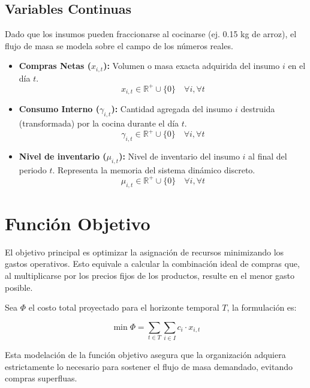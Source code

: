 \documentclass[12pt]{report}
\begin{document}
\subsection{Variables Continuas}
Dado que los insumos pueden fraccionarse al cocinarse (ej. 0.15 kg de arroz), el flujo de masa se modela sobre el campo de los números reales.
\begin{itemize}
    \item \textbf{Compras Netas ($x_{i,t}$):} Volumen o masa exacta adquirida del insumo $i$ en el día $t$.
    \begin{equation}
        x_{i,t} \in \mathbb{R}^{+} \cup \{0\} \quad \forall i, \forall t
    \end{equation}

    \item \textbf{Consumo Interno ($\gamma_{i,t}$):} Cantidad agregada del insumo $i$ destruida (transformada) por la cocina durante el día $t$.
    \begin{equation}
        \gamma_{i,t} \in \mathbb{R}^{+} \cup \{0\} \quad \forall i, \forall t
    \end{equation}

    \item \textbf{Nivel de inventario ($\mu_{i,t}$):} Nivel de inventario del insumo $i$ al final del periodo $t$. Representa la memoria del sistema dinámico discreto.
    \begin{equation}
        \mu_{i,t} \in \mathbb{R}^{+} \cup \{0\} \quad \forall i, \forall t
    \end{equation}
\end{itemize}

\section{Función Objetivo}

El objetivo principal es optimizar la asignación de recursos minimizando los gastos operativos. Esto equivale a calcular la combinación ideal de compras que, al multiplicarse por los precios fijos de los productos, resulte en el menor gasto posible. 

Sea $\Phi$ el costo total proyectado para el horizonte temporal $T$, la formulación es:

\begin{equation}
    \min \Phi = \sum_{t \in T} \sum_{i \in I} c_i \cdot x_{i,t}
\end{equation}

Esta modelación de la función objetivo asegura que la organización adquiera estrictamente lo necesario para sostener el flujo de masa demandado, evitando compras superfluas.
\end{document}
